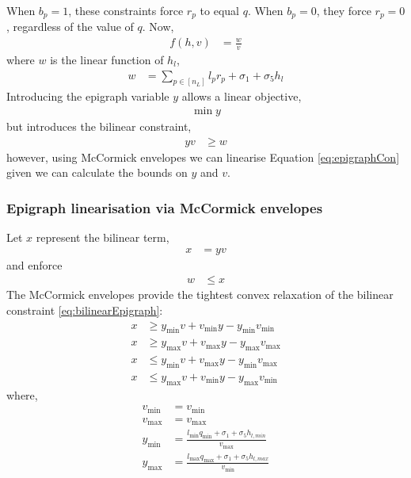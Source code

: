 \documentclass[11pt]{article}
\begin{document}
When $b_p = 1$, these constraints force $r_p$ to equal $q$. When $b_p = 0$, they force $r_p = 0$, regardless of the value of $q$. Now,
\begin{align}
  f(h,v) &= \frac{w}{v}
\end{align}
where $w$ is the linear function of $h_l$,
\begin{align}
  w &= \sum_{p \in [n_L]}l_pr_p+\sigma_1 + \sigma_5h_l
\end{align}
Introducing the epigraph variable $y$ allows a linear objective,
\begin{align}
  \min y
\end{align}
but introduces the bilinear constraint,
\begin{align}
  yv &\geq w \label{eq:epigraphCon}
\end{align}
however, using McCormick envelopes we can linearise Equation \ref{eq:epigraphCon} given we can calculate the bounds on $y$ and $v$.

\subsubsection{Epigraph linearisation via McCormick envelopes}

Let $x$ represent the bilinear term,
\begin{align}
  x &= yv \label{eq:bilinearEpigraph}
\end{align}
and enforce
\begin{align}
  w &\leq x
\end{align}
The McCormick envelopes provide the tightest convex relaxation of the bilinear constraint \ref{eq:bilinearEpigraph}:
\begin{align}
  x &\ge y_{\min} v + v_{\min} y - y_{\min} v_{\min} \\
  x &\ge y_{\max} v + v_{\max} y - y_{\max} v_{\max} \\
  x &\le y_{\min} v + v_{\max} y - y_{\min} v_{\max} \\
  x &\le y_{\max} v + v_{\min} y - y_{\max} v_{\min}
\end{align}
where,
\begin{align}
  v_{\min} &= v_{\min}\\
  v_{\max} &= v_{\max}\\
  y_{\min} &= \frac{l_{\min}q_{\min} +\sigma_1 + \sigma_5h_{l,min}}{v_{\max}}\\
  y_{\max} &= \frac{l_{\max}q_{\max} +\sigma_1 + \sigma_5h_{l,max}}{v_{\min}}
\end{align}
\end{document}
